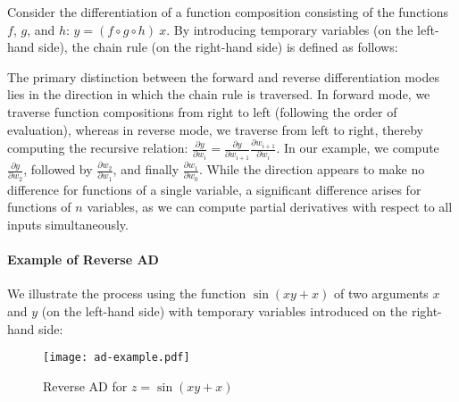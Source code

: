 Consider the differentiation of a function composition consisting of the
functions \(f\), \(g\), and \(h\):
\(
y = (f \circ g \circ h)\ x.
\)
By introducing temporary variables (on the left-hand side), the
chain rule (on the right-hand side) is defined as follows:
The primary distinction between the forward and reverse differentiation modes
lies in the direction in which the chain rule is traversed. In forward mode, we
traverse function compositions from right to left (following the order of
evaluation), whereas in reverse mode, we traverse from left to right, thereby
computing the recursive relation:
\(
\frac{\partial y}{\partial w_i} = \frac{\partial y}{\partial w_{i+1}} \frac{\partial w_{i+1}}{\partial w_i}.
\)
In our example, we compute \(\frac{\partial y}{\partial w_2}\), followed by
\(\frac{\partial w_2}{\partial w_1}\), and finally \(\frac{\partial
w_1}{\partial w_0}\). While the direction appears to make no difference for functions of
a single variable, a significant difference arises for functions of \(n\)
variables, as we can compute partial derivatives with respect to all inputs
simultaneously.

\paragraph{Example of Reverse AD}
We illustrate the process using the function \(\sin(xy + x)\) of two arguments \(x\)
and \(y\)
(on the left-hand side) with temporary variables introduced on the right-hand side:

\begin{figure}
  \texttt{[image: ad-example.pdf]}
  \caption{\label{fig:ad-graph}Reverse AD for \(z = \sin(xy+x)\)}
\end{figure}

